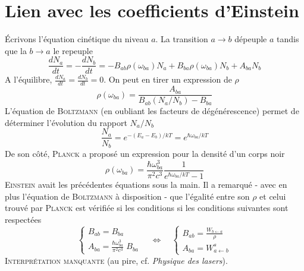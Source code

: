 \section{Lien avec les coefficients d'Einstein}
Écrivons l'équation cinétique du niveau $a$. La transition $a\to b$ dépeuple $a$ tandis que
la $b\to a$ le repeuple
\begin{equation}
\frac{dN_a}{dt} = - \frac{dN_b}{dt} =
- B_{ab} \rho(\omega_{ba}) N_a + B_{ba} \rho(\omega_{ba}) N_b
 + A_{ba} N_b
\end{equation}
A l'équilibre, $\frac{dN_a}{dt} = \frac{dN_b}{dt} = 0$. On peut en tirer un expression de $\rho$
\begin{equation}
\rho(\omega_{ba}) = 
\frac{A_{ba} }{B_{ab} (N_a/N_b) - B_{ba}}
\end{equation}
L'équation de \textsc{Boltzmann} (en oubliant les facteurs de dégénérescence) permet de déterminer
l'évolution du rapport $N_a/N_b$
\begin{equation}
\frac{N_a}{N_b} = e^{-(E_a - E_b)/kT} = e^{\hbar \omega_{ba} /kT}
\end{equation}
De son côté, \textsc{Planck} a proposé un expression pour la densité d'un corps noir
\begin{equation}
\rho(\omega_{ba})
= \frac{\hbar \omega_{ba}^3}{\pi^2 c^3}
\frac{1}{e^{\hbar \omega_{ba} /kT} -1  }
\end{equation}
\textsc{Einstein} avait les précédentes équations sous la main.  Il a remarqué - avec en plus 
l'équation de \textsc{Boltzmann} à disposition - que l'égalité entre son $\rho$ et celui trouvé par
\textsc{Planck} est vérifiée si les conditions si les conditions suivantes sont respectées
\begin{equation}
\left\{
\begin{array}{l}
B_{ab} = B_{ba} \\
A_{ba} = \frac{\hbar \omega_{ba}^3}{\pi^2 c^3} \; B_{ba}
\end{array} \right. \quad\Leftrightarrow\quad
 \left\{ \begin{array}{l}
B_{ab} = \frac{W_{b \leftarrow a}}{\rho} \\
A_{ba} = W^s_{a \leftarrow b}
\end{array} \right.
\end{equation}
\textsc{Interprétation manquante} (au pire, cf. \textit{Physique des lasers}).

